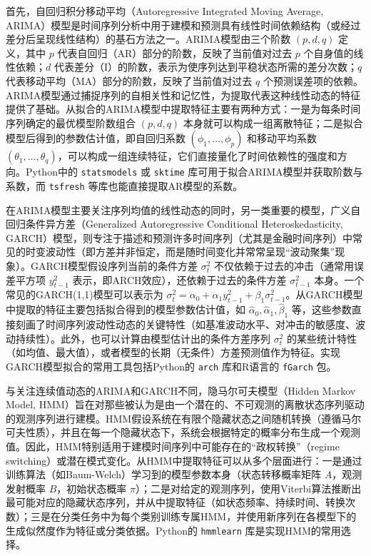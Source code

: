 首先，自回归积分移动平均（Autoregressive Integrated Moving Average, ARIMA）模型是时间序列分析中用于建模和预测具有线性时间依赖结构（或经过差分后呈现线性结构）的基石方法之一。ARIMA模型由三个阶数 $(p, d, q)$ 定义，其中 $p$ 代表自回归（AR）部分的阶数，反映了当前值对过去 $p$ 个自身值的线性依赖；$d$ 代表差分（I）的阶数，表示为使序列达到平稳状态所需的差分次数；$q$ 代表移动平均（MA）部分的阶数，反映了当前值对过去 $q$ 个预测误差项的依赖。ARIMA模型通过捕捉序列的自相关性和记忆性，为提取代表这种线性动态的特征提供了基础。从拟合的ARIMA模型中提取特征主要有两种方式：一是为每条时间序列确定的最优模型阶数组合 $(p, d, q)$ 本身就可以构成一组离散特征；二是拟合模型后得到的参数估计值，即自回归系数 $(\phi_1, \dots, \phi_p)$ 和移动平均系数 $(\theta_1, \dots, \theta_q)$，可以构成一组连续特征，它们直接量化了时间依赖性的强度和方向。Python中的 \texttt{statsmodels} 或 \texttt{sktime} 库可用于拟合ARIMA模型并获取阶数与系数，而 \texttt{tsfresh} 等库也能直接提取AR模型的系数。

在ARIMA模型主要关注序列均值的线性动态的同时，另一类重要的模型，广义自回归条件异方差（Generalized Autoregressive Conditional Heteroskedasticity, GARCH）模型，则专注于描述和预测许多时间序列（尤其是金融时间序列）中常见的时变波动性（即方差并非恒定，而是随时间变化并常常呈现“波动聚集”现象）。GARCH模型假设序列当前的条件方差 $\sigma_t^2$ 不仅依赖于过去的冲击（通常用误差平方项 $y_{t-1}^2$ 表示，即ARCH效应），还依赖于过去的条件方差 $\sigma_{t-1}^2$ 本身。一个常见的GARCH(1,1)模型可以表示为 $\sigma_t^2 = \alpha_0 + \alpha_1 y_{t-1}^2 + \beta_1 \sigma_{t-1}^2$。从GARCH模型中提取的特征主要包括拟合得到的模型参数估计值，如 $\hat{\alpha}_0, \hat{\alpha}_1, \hat{\beta}_1$ 等，这些参数直接刻画了时间序列波动性动态的关键特性（如基准波动水平、对冲击的敏感度、波动持续性）。此外，也可以计算由模型估计出的条件方差序列 $\sigma_t^2$ 的某些统计特性（如均值、最大值），或者模型的长期（无条件）方差预测值作为特征。实现GARCH模型拟合的常用工具包括Python的 \texttt{arch} 库和R语言的 \texttt{fGarch} 包。

与关注连续值动态的ARIMA和GARCH不同，隐马尔可夫模型（Hidden Markov Model, HMM）旨在对那些被认为是由一个潜在的、不可观测的离散状态序列驱动的观测序列进行建模。HMM假设系统在有限个隐藏状态之间随机转换（遵循马尔可夫性质），并且在每一个隐藏状态下，系统会根据特定的概率分布生成一个观测值。因此，HMM特别适用于建模时间序列中可能存在的“政权转换”（regime switching）或潜在模式变化。从HMM中提取特征可以从多个层面进行：一是通过训练算法（如Baum-Welch）学习到的模型参数本身（状态转移概率矩阵 $A$，观测发射概率 $B$，初始状态概率 $\pi$）；二是对给定的观测序列，使用Viterbi算法推断出最可能对应的隐藏状态序列，并从中提取特征（如状态频率、持续时间、转换次数）；三是在分类任务中为每个类别训练专属HMM，并使用新序列在各模型下的生成似然度作为特征或分类依据。Python的 \texttt{hmmlearn} 库是实现HMM的常用选择。


